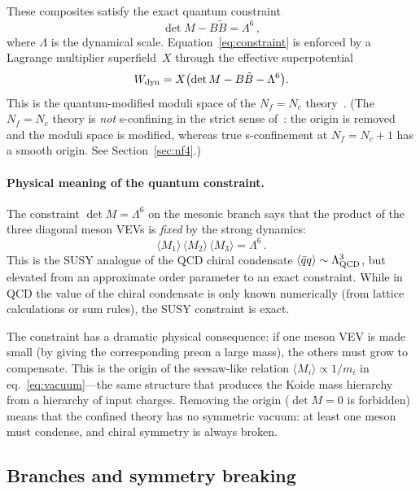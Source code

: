 \documentclass[12pt,a4paper]{article}
\newcommand{\Nf}{N_f}
\newcommand{\Nc}{N_c}
\begin{document}
These composites satisfy the exact quantum constraint
\begin{equation}
  \det M - B\tilde{B} = \Lambda^6\,,
  \label{eq:constraint}
\end{equation}
where $\Lambda$ is the dynamical scale. Equation~\eqref{eq:constraint}
is enforced by a Lagrange multiplier superfield~$X$ through the
effective superpotential
\begin{equation}
  W_{\rm dyn} = X\bigl(\det M - B\tilde{B} - \Lambda^6\bigr).
  \label{eq:Wdyn}
\end{equation}
This is the quantum-modified moduli space of the $\Nf = \Nc$
theory~\cite{Seiberg:1994bz}. (The $\Nf = \Nc$ theory is \emph{not}
s-confining in the strict sense of~\cite{CsakiSchmaltzSkiba:1997}:
the origin is removed and the moduli space is modified, whereas true
s-confinement at $\Nf = \Nc + 1$ has a smooth origin. See
Section~\ref{sec:nf4}.)

\paragraph{Physical meaning of the quantum constraint.}
The constraint $\det M = \Lambda^6$ on the mesonic branch says
that the product of the three diagonal meson VEVs is \emph{fixed}
by the strong dynamics:
\begin{equation}
  \langle M_1\rangle\,\langle M_2\rangle\,\langle M_3\rangle
  = \Lambda^6\,.
  \label{eq:detfixed}
\end{equation}
This is the SUSY analogue of the QCD chiral condensate
$\langle\bar qq\rangle \sim \Lambda_{\rm QCD}^3$, but elevated
from an approximate order parameter to an exact constraint.
While in QCD the value of the chiral condensate is only known
numerically (from lattice calculations or sum rules), the SUSY
constraint is exact.

The constraint has a dramatic physical consequence: if one meson
VEV is made small (by giving the corresponding preon a large mass),
the others must grow to compensate. This is the origin of
the seesaw-like relation $\langle M_i\rangle \propto 1/m_i$ in
eq.~\eqref{eq:vacuum}---the same structure that produces the
Koide mass hierarchy from a hierarchy of input charges.
Removing the origin ($\det M = 0$ is forbidden) means
that the confined theory has no symmetric vacuum: at least one
meson must condense, and chiral symmetry is always broken.

\subsection{Branches and symmetry breaking}
\end{document}
